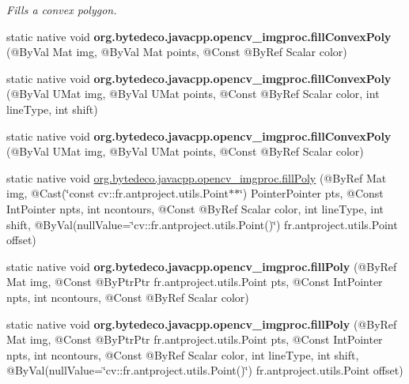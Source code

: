 \begin{DoxyCompactItemize}
\begin{DoxyCompactList}\small\item\em Fills a convex polygon. \end{DoxyCompactList}\item 
\mbox{\label{group__imgproc__draw_gac89b28becb0488e662daef2c0300e7c5}} 
static native void {\bfseries org.\+bytedeco.\+javacpp.\+opencv\+\_\+imgproc.\+fill\+Convex\+Poly} (@By\+Val Mat img, @By\+Val Mat points, @Const @By\+Ref Scalar color)
\item 
\mbox{\label{group__imgproc__draw_ga9076c390b47e180ec4f854127545d84e}} 
static native void {\bfseries org.\+bytedeco.\+javacpp.\+opencv\+\_\+imgproc.\+fill\+Convex\+Poly} (@By\+Val U\+Mat img, @By\+Val U\+Mat points, @Const @By\+Ref Scalar color, int line\+Type, int shift)
\item 
\mbox{\label{group__imgproc__draw_ga097ccf99163a73bb60e3dd748167707c}} 
static native void {\bfseries org.\+bytedeco.\+javacpp.\+opencv\+\_\+imgproc.\+fill\+Convex\+Poly} (@By\+Val U\+Mat img, @By\+Val U\+Mat points, @Const @By\+Ref Scalar color)
\item 
static native void \hyperlink{group__imgproc__draw_ga885773572ec9b1e9c138b4656851a82a}{org.\+bytedeco.\+javacpp.\+opencv\+\_\+imgproc.\+fill\+Poly} (@By\+Ref Mat img, @Cast(\char`\"{}const cv\+::\+fr.antproject.utils.Point$\ast$$\ast$\char`\"{}) Pointer\+Pointer pts, @Const Int\+Pointer npts, int ncontours, @Const @By\+Ref Scalar color, int line\+Type, int shift, @By\+Val(null\+Value=\char`\"{}cv\+::\+fr.antproject.utils.Point()\char`\"{}) fr.antproject.utils.Point offset)
\item 
\mbox{\label{group__imgproc__draw_ga3f404a02bbd4d43005efc2fafc12cd2b}} 
static native void {\bfseries org.\+bytedeco.\+javacpp.\+opencv\+\_\+imgproc.\+fill\+Poly} (@By\+Ref Mat img, @Const @By\+Ptr\+Ptr fr.antproject.utils.Point pts, @Const Int\+Pointer npts, int ncontours, @Const @By\+Ref Scalar color)
\item 
\mbox{\label{group__imgproc__draw_ga9df35c412563323a7f67ee8472ba42d7}} 
static native void {\bfseries org.\+bytedeco.\+javacpp.\+opencv\+\_\+imgproc.\+fill\+Poly} (@By\+Ref Mat img, @Const @By\+Ptr\+Ptr fr.antproject.utils.Point pts, @Const Int\+Pointer npts, int ncontours, @Const @By\+Ref Scalar color, int line\+Type, int shift, @By\+Val(null\+Value=\char`\"{}cv\+::\+fr.antproject.utils.Point()\char`\"{}) fr.antproject.utils.Point offset)
$$
\end{DoxyCompactItemize}
